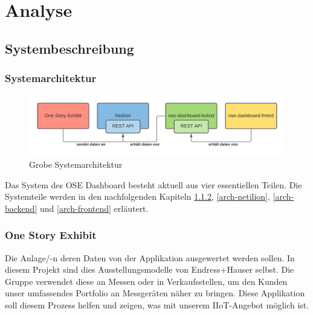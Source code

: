 
\chapter{Analyse}
\section{Systembeschreibung}
\subsection{Systemarchitektur}
\begin{figure}[!ht]
  \centering
  \includegraphics[width=1\linewidth]{./images/system.png}
  \caption[Eine von mir mit Lucidchart erstellte grobe Systemarchitektur]{Grobe Systemarchitektur}
  \label{fig:systemarchitektur}
\end{figure}
Das System des OSE Dashboard besteht aktuell aus vier essentiellen Teilen. Die Systemteile werden in den nachfolgenden Kapiteln \ref{arch-ose}, \ref{arch-netilion}, \ref{arch-backend} und \ref{arch-frontend} erläutert.
\subsection{One Story Exhibit} \label{arch-ose}
Die Anlage/-n deren Daten von der Applikation ausgewertet werden sollen. In diesem Projekt sind dies Ausstellungsmodelle von Endress+Hauser selbst. Die Gruppe verwendet diese an Messen oder in Verkaufsstellen, um den Kunden unser umfassendes Portfolio an Messgeräten näher zu bringen. Diese Applikation soll diesem Prozess helfen und zeigen, was mit unserem IIoT-Angebot möglich ist.
